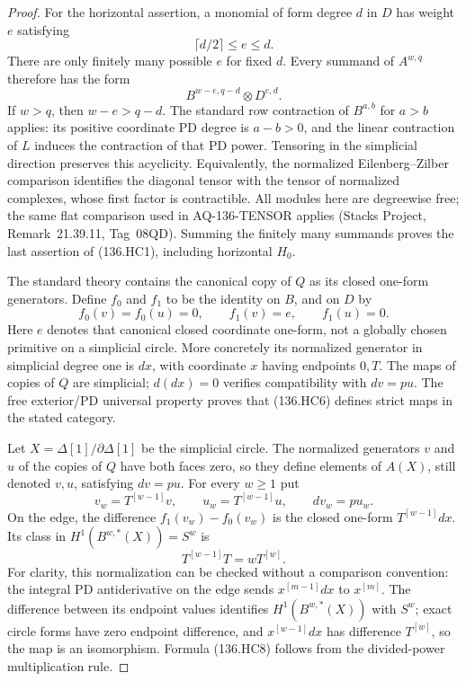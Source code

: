 \begin{proof}
For the horizontal assertion, a monomial of form degree $d$
in $D$ has weight $e$ satisfying
\[
                          \lceil d/2\rceil\le e\le d.
                                                               \tag{136.HC5}
\]
There are only finitely many possible $e$ for fixed $d$.
Every summand of $A^{w,q}$ therefore has the form
\[
                 B^{w-e,q-d}\otimes D^{e,d}.
\]
If $w>q$, then $w-e>q-d$. The standard row contraction
of $B^{a,b}$ for $a>b$ applies: its positive coordinate
PD degree is $a-b>0$, and the linear contraction of $L$
induces the contraction of that PD power. Tensoring in
the simplicial direction preserves this acyclicity.
Equivalently, the normalized Eilenberg--Zilber comparison
identifies the diagonal tensor with the tensor of normalized
complexes, whose first factor is contractible. All modules
here are degreewise free; the same flat comparison used in
AQ-136-TENSOR applies (Stacks Project, Remark~21.39.11,
Tag~08QD). Summing the finitely many summands proves the
last assertion of (136.HC1), including horizontal $H_0$.

The standard theory contains the canonical copy of $Q$ as
its closed one-form generators. Define $f_0$ and $f_1$ to
be the identity on $B$, and on $D$ by
\[
       f_0(v)=f_0(u)=0,\qquad f_1(v)=e,
                                  \qquad f_1(u)=0.        \tag{136.HC6}
\]
Here $e$ denotes that canonical closed coordinate
one-form, not a globally chosen primitive on a simplicial
circle. More concretely its normalized generator in
simplicial degree one is $dx$, with coordinate $x$ having
endpoints $0,T$. The maps of copies of $Q$ are simplicial;
$d(dx)=0$ verifies compatibility with $dv=pu$.
The free exterior/PD universal property proves that
(136.HC6) defines strict maps in the stated category.

Let $X=\Delta[1]/\partial\Delta[1]$ be the simplicial circle.
The normalized generators $v$ and $u$ of the copies of $Q$
have both faces zero, so they define elements of $A(X)$,
still denoted $v,u$, satisfying $dv=pu$.
For every $w\ge1$ put
\[
             v_w=T^{[w-1]}v,\qquad
             u_w=T^{[w-1]}u,\qquad dv_w=p u_w.             \tag{136.HC7}
\]
On the edge, the difference $f_1(v_w)-f_0(v_w)$ is the
closed one-form $T^{[w-1]}dx$.
Its class in $H^1(B^{w,*}(X))=S^w$ is
\[
                  T^{[w-1]}T=wT^{[w]}.                    \tag{136.HC8}
\]
For clarity, this normalization can be checked without a
comparison convention: the integral PD antiderivative on
the edge sends $x^{[m-1]}dx$ to $x^{[m]}$.
The difference between its endpoint values identifies
$H^1(B^{w,*}(X))$ with $S^w$; exact circle forms have zero
endpoint difference, and $x^{[w-1]}dx$ has difference
$T^{[w]}$, so the map is an isomorphism. Formula (136.HC8)
follows from the divided-power multiplication rule.


\end{proof}
